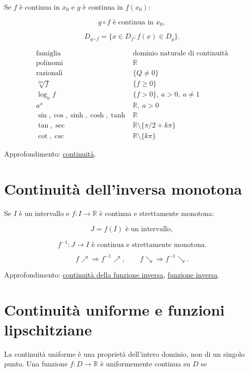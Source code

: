 Se \(f\) è continua in \(x_0\) e \(g\) è continua in \(f(x_0)\):

\[
g\circ f\text{ è continua in }x_0,
\]

\[
D_{g\circ f}=\{x\in D_f:f(x)\in D_g\}.
\]

\[
\begin{array}{c|c}
\text{famiglia}&\text{dominio naturale di continuità}\\
\hline
\text{polinomi}&\mathbb R\\
\text{razionali}&\{Q\ne0\}\\
\sqrt[2m]{f}&\{f\ge0\}\\
\log_a f&\{f>0\},\ a>0,\ a\ne1\\
a^x&\mathbb R,\ a>0\\
\sin,\cos,\sinh,\cosh,\tanh&\mathbb R\\
\tan,\sec&\mathbb R\setminus\{\pi/2+k\pi\}\\
\cot,\csc&\mathbb R\setminus\{k\pi\}
\end{array}
\]

Approfondimento: \href{https://ingegnerismo.it/matematica/continuita/}{continuità}.

\section{Continuità dell'inversa monotona}\label{continuituxe0-dellinversa-monotona}

Se \(I\) è un intervallo e \(f:I\to\mathbb R\) è continua e strettamente monotona:

\[
J=f(I)\text{ è un intervallo},
\]

\[
f^{-1}:J\to I\text{ è continua e strettamente monotona}.
\]

\[
f\nearrow\Longrightarrow f^{-1}\nearrow,
\qquad
f\searrow\Longrightarrow f^{-1}\searrow.
\]

Approfondimento: \href{https://ingegnerismo.it/matematica/continuita-della-funzione-inversa/}{continuità della funzione inversa}, \href{https://ingegnerismo.it/matematica/funzione-inversa/}{funzione inversa}.

\section{Continuità uniforme e funzioni lipschitziane}\label{continuituxe0-uniforme-e-funzioni-lipschitziane}

La continuità uniforme è una proprietà dell'intero dominio, non di un singolo punto. Una funzione \(f:D\to\mathbb R\) è uniformemente continua su \(D\) se

